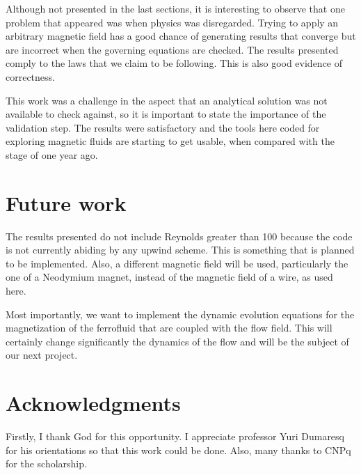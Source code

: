 \documentclass[journal]{IEEEtran}
\begin{document}
Although not presented in the last sections, it is interesting to observe that one problem that appeared was when physics was disregarded. Trying to apply an arbitrary magnetic field has a good chance of generating results that converge but are incorrect when the governing equations are checked. The results presented comply to the laws that we claim to be following. This is also good evidence of correctness.

This work was a challenge in the aspect that an analytical solution was not available to check against, so it is important to state the importance of the validation step. The results were satisfactory and the tools here coded for exploring magnetic fluids are starting to get usable, when compared with the stage of one year ago.


\section{Future work}
The results presented do not include Reynolds greater than 100 because the code is not currently abiding by any upwind scheme. This is something that is planned to be implemented. Also, a different magnetic field will be used, particularly the one of a Neodymium magnet, instead of the magnetic field of a wire, as used here.

Most importantly, we want to implement the dynamic evolution equations for the magnetization of the ferrofluid that are coupled with the flow field. This will certainly change significantly the dynamics of the flow and will be the subject of our next project.




\section*{Acknowledgments}

Firstly, I thank God for this opportunity. I appreciate professor Yuri Dumaresq for his orientations so that this work could be done. Also, many thanks to CNPq for the scholarship.




\end{document}
